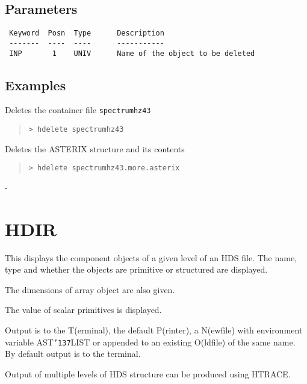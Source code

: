 \documentclass{book}
\renewcommand{\_}{{\tt\char'137}}     %
\begin{document}
\subsection{Parameters}
\begin{verbatim}
 Keyword  Posn  Type      Description
 -------  ----  ----      -----------
 INP       1    UNIV      Name of the object to be deleted

\end{verbatim}\subsection{Examples}
Deletes the container file {\tt spectrumhz43}
\begin{quote}\begin{verbatim}
> hdelete spectrumhz43
\end{verbatim}\end{quote}
Deletes the ASTERIX structure and its contents
\begin{quote}\begin{verbatim}
> hdelete spectrumhz43.more.asterix
\end{verbatim}\end{quote}
-
\section{HDIR}
This displays the component objects of a given level of
an HDS file. The name, type and whether the objects are
primitive or structured are displayed.

The dimensions of array object are also given.

The value of scalar primitives is displayed.

Output is to the T(erminal), the default P(rinter), a N(ewfile)
with environment variable AST\_LIST or appended to an existing O(ldfile)
of the same name. By default output is to the terminal.

Output of multiple levels of HDS structure can be produced using HTRACE.
\end{document}
